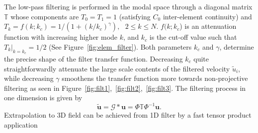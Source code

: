 The low-pass filtering is performed in the modal space through a diagonal matrix $\mathbb{T}$ whose components are $T_0 = T_1 = 1$ (satisfying $C_0$ inter-element continuity) and $T_k = f(k;k_c) = 1/(1 + (k/k_c)^\gamma) , \ \ \ 2\le k\le N$. $f(k;k_c$) is an attenuation function with increasing higher mode $k$, and $k_c$ is the cut-off value such that $T_k|_{k=k_c} = 1/2$ (See Figure~\ref{fig:elem_filter}). Both parameters  $k_c$ and $\gamma$, determine the precise shape of the filter transfer function. Decreasing $k_c$ quite straightforwardly attenuate the large scale contents of the filtered velocity $\widetilde{u}_{i}$, while decreasing $\gamma$ smoothens the transfer function more towards non-projective filtering as seen in Figure~\ref{fig:filt1},~\ref{fig:filt2},~\ref{fig:filt3}. 
 The filtering process in one dimension is given by
\begin{equation}
\widetilde{\pmb{u}} = \mathcal{G}*\pmb{u} = \Phi\mathbb{T}\Phi^{-1}\pmb{u}.
\end{equation}
Extrapolation to 3D field can be achieved from 1D filter by a fast tensor product application~\cite{lynch}

